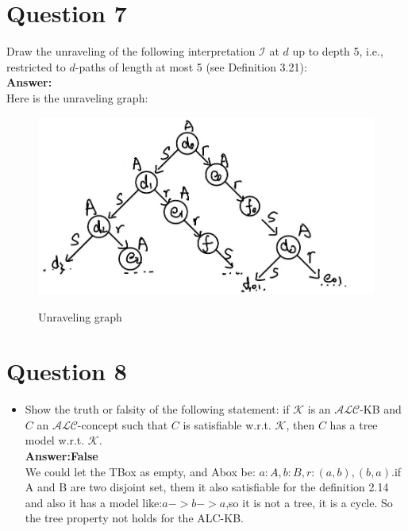 \documentclass{article}
\begin{document}
    \section{Question 7}
    Draw the unraveling of the following interpretation $\mathcal{I}$ at $d$ up to depth 5, i.e., restricted to $d$-paths of length at most 5 (see Definition 3.21):\\
    \textbf{Answer:}\\
    Here is the unraveling graph:\\
    \begin{figure}[H]
        \centering
        \includegraphics[width=1\textwidth]{3.png}\\
        \caption{Unraveling graph}
        \label{fig:Unraveling}
    \end{figure}  

    \section{Question 8}
    \begin{itemize}
        \item Show the truth or falsity of the following statement: if $\mathcal{K}$ is an $\mathcal{ALC}$-KB and $C$ an $\mathcal{ALC}$-concept such that $C$ is satisfiable w.r.t. $\mathcal{K}$, then $C$ has a tree model w.r.t. $\mathcal{K}$.\\
        \textbf{Answer:False}\\
        We could let the TBox as empty, and Abox be: $a:A,b:B,r:(a,b),(b,a)$.if A and B are two disjoint set, them it also satisfiable for the definition 2.14 and also it has a model like:$a->b->a$,so it is not a tree, it is a cycle. So the tree property not holds for the ALC-KB.
    \end{itemize}
\end{document}
